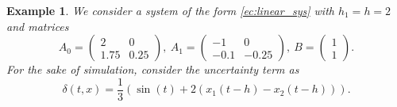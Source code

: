 \documentclass[onecolumn]{IEEEtran}
\newtheorem{example}{Example}
\begin{document}
\begin{example}
	We consider a system of the form \eqref{ec:linear_sys} with $h_1=h=2$ and matrices \cite{Gouaisbautetal2002}
	\begin{equation*}
	A_0=\begin{pmatrix}
	2 & 0\\
	1.75 & 0.25
	\end{pmatrix},\:A_1=\begin{pmatrix}
	-1 & 0\\
	-0.1 & -0.25
	\end{pmatrix},\:B=\begin{pmatrix}
	1\\1
	\end{pmatrix}.
	\end{equation*}
	For the sake of simulation, consider the uncertainty term as $$\delta(t,x)=\dfrac{1}{3}\left(\sin(t)+2(x_1(t-h)-x_2(t-h))\right).$$
	

\end{example}
\end{document}
